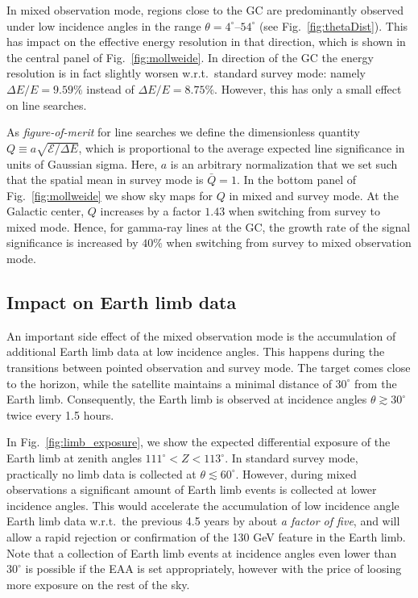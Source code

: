 \documentclass[aps,prd,superscriptaddress,showpacs,nofootinbib,fixlfloat, 12pt]{revtex4-1}
\begin{document}
In mixed observation mode, regions close to the GC are predominantly observed
under low incidence angles in the range $\theta=4^\circ$--$54^\circ$ (see
Fig.~\ref{fig:thetaDist}). This has impact on the effective energy resolution
in that direction, which is shown in the central panel of
Fig.~\ref{fig:mollweide}. In direction of the GC the energy resolution is in
fact slightly worsen w.r.t.~standard survey mode: namely $\Delta E/E=9.59\%$
instead of $\Delta E/E=8.75\%$. However, this has only a small effect on line
searches.

As \emph{figure-of-merit} for line searches we define the dimensionless
quantity $Q\equiv a\sqrt{\mathcal{E}/\Delta E}$, which is proportional to the
average expected line significance in units of Gaussian sigma. Here, $a$ is an
arbitrary normalization that we set such that the spatial mean in survey mode
is $\bar Q=1$. In the bottom panel of Fig.~\ref{fig:mollweide} we show sky
maps for $Q$ in mixed and survey mode. At the Galactic center, $Q$ increases
by a factor $1.43$ when switching from survey to mixed mode. Hence, for
gamma-ray lines at the GC, the growth rate of the signal significance is
increased by $40\%$ when switching from survey to mixed observation mode.

\subsection{Impact on Earth limb data}
An important side effect of the mixed observation mode is the accumulation of
additional Earth limb data at low incidence angles. This happens during the
transitions between pointed observation and survey mode. The target comes
close to the horizon, while the satellite maintains a minimal distance of
$30^\circ$ from the Earth limb. Consequently, the Earth limb is observed at
incidence angles $\theta\gtrsim30^\circ$ twice every 1.5 hours.

In Fig.~\ref{fig:limb_exposure}, we show the expected differential exposure of
the Earth limb at zenith angles $111^\circ<Z<113^\circ$. In standard survey
mode, practically no limb data is collected at $\theta\lesssim60^\circ$.
However, during mixed observations a significant amount of Earth limb events
is collected at lower incidence angles. This would accelerate the accumulation
of low incidence angle Earth limb data w.r.t.~the previous 4.5 years by about
\emph{a factor of five}, and will allow a rapid rejection or confirmation of
the 130 GeV feature in the Earth limb. Note that a collection of Earth limb
events at incidence angles even lower than $30^\circ$ is possible if the EAA
is set appropriately, however with the price of loosing more exposure on the
rest of the sky.
\end{document}
